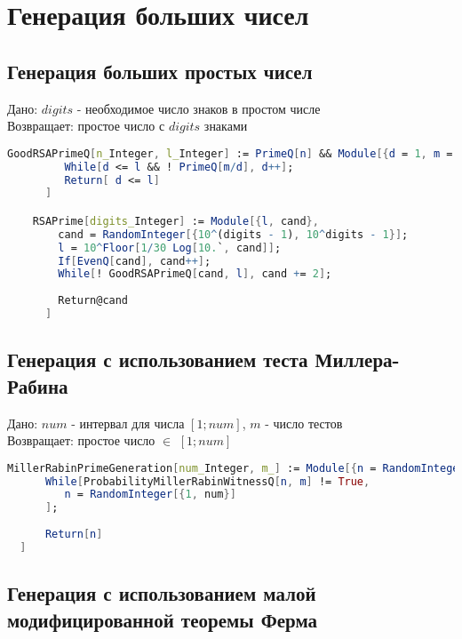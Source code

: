 \chapter{Генерация больших чисел}

  \section{Генерация больших простых чисел}

    Дано: {$digits$} - необходимое число знаков в простом числе \\
    Возвращает: простое число с  {$digits$} знаками

    \begin{lstlisting}[language=Mathematica,caption={
      Генерация больших простых чисел
    }]
    GoodRSAPrimeQ[n_Integer, l_Integer] := PrimeQ[n] && Module[{d = 1, m = (n - 1)/2},
	     While[d <= l && ! PrimeQ[m/d], d++];
	     Return[ d <= l]
	  ]

    RSAPrime[digits_Integer] := Module[{l, cand},
        cand = RandomInteger[{10^(digits - 1), 10^digits - 1}];
        l = 10^Floor[1/30 Log[10.`, cand]];
        If[EvenQ[cand], cand++];
        While[! GoodRSAPrimeQ[cand, l], cand += 2];
        
        Return@cand
      ]

    \end{lstlisting}

  \section{Генерация с использованием теста Миллера-Рабина}

    Дано: {$num$} - интервал для числа {$[1;num]$}, {$m$} - число тестов \\
    Возвращает: простое число {$\in$} {$[1;num]$}

    \begin{lstlisting}[language=Mathematica,caption={
      Генерация с использованием теста Миллера-Рабина  
    }]
  MillerRabinPrimeGeneration[num_Integer, m_] := Module[{n = RandomInteger[{1, num}]},
      While[ProbabilityMillerRabinWitnessQ[n, m] != True, 
         n = RandomInteger[{1, num}]
      ];
      
      Return[n]
  ]
    \end{lstlisting}

  \section{Генерация с использованием малой модифицированной теоремы Ферма}

